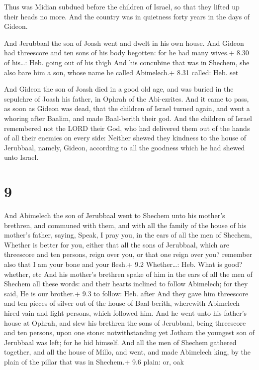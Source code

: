  Thus was Midian subdued before the children of Israel,
so that they lifted up their heads no more. And the country was in
quietness forty years in the days of Gideon.

 And Jerubbaal the son of Joash went and dwelt in his own
house.  And Gideon had threescore and ten sons of his body
begotten: for he had many wives.+ 8.30 of his\ldots: Heb. going out of
his thigh  And his concubine that was in Shechem, she also
bare him a son, whose name he called Abimelech.+ 8.31 called: Heb. set

 And Gideon the son of Joash died in a good old age, and
was buried in the sepulchre of Joash his father, in Ophrah of the
Abi-ezrites.  And it came to pass, as soon as Gideon was
dead, that the children of Israel turned again, and went a whoring after
Baalim, and made Baal-berith their god.  And the children
of Israel remembered not the LORD their God, who had delivered them out
of the hands of all their enemies on every side:  Neither
shewed they kindness to the house of Jerubbaal, namely, Gideon,
according to all the goodness which he had shewed unto Israel.

\hypertarget{section-8}{%
\section{9}\label{section-8}}

 And Abimelech the son of Jerubbaal went to Shechem unto his
mother's brethren, and communed with them, and with all the family of
the house of his mother's father, saying,  Speak, I pray
you, in the ears of all the men of Shechem, Whether is better for you,
either that all the sons of Jerubbaal, which are threescore and ten
persons, reign over you, or that one reign over you? remember also that
I am your bone and your flesh.+ 9.2 Whether\ldots: Heb. What is good?
whether, etc  And his mother's brethren spake of him in the
ears of all the men of Shechem all these words: and their hearts
inclined to follow Abimelech; for they said, He is our brother.+ 9.3 to
follow: Heb. after  And they gave him threescore and ten
pieces of silver out of the house of Baal-berith, wherewith Abimelech
hired vain and light persons, which followed him.  And he
went unto his father's house at Ophrah, and slew his brethren the sons
of Jerubbaal, being threescore and ten persons, upon one stone:
notwithstanding yet Jotham the youngest son of Jerubbaal was left; for
he hid himself.  And all the men of Shechem gathered
together, and all the house of Millo, and went, and made Abimelech king,
by the plain of the pillar that was in Shechem.+ 9.6 plain: or, oak

